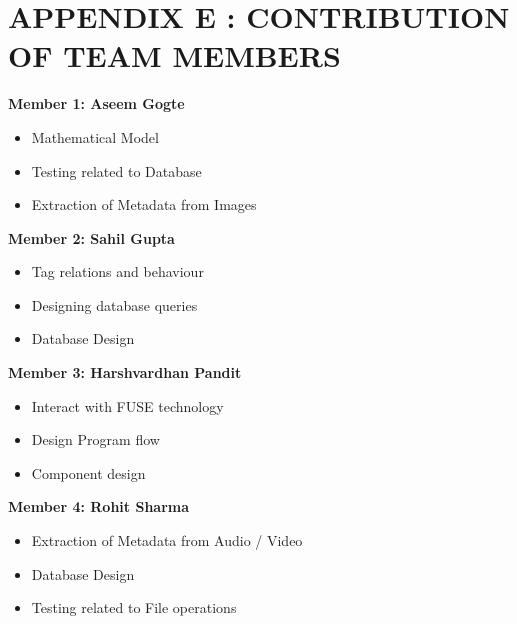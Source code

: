 \section{APPENDIX E : CONTRIBUTION OF TEAM MEMBERS} 
\noindent \textbf{Member 1: Aseem Gogte} 
\begin{itemize}
\item Mathematical Model
\item Testing related to Database 
\item Extraction of Metadata from Images \\
\end{itemize}

\noindent \textbf{Member 2: Sahil Gupta}
\begin{itemize}
\item Tag relations and behaviour
\item Designing database queries
\item Database Design \\
\end{itemize}

\noindent \textbf {Member 3: Harshvardhan Pandit} 
\begin{itemize}
\item Interact with FUSE technology
\item Design Program flow
\item Component design \\
\end{itemize}

\noindent \textbf {Member 4: Rohit Sharma} 
\begin{itemize}
\item Extraction of Metadata from Audio / Video 
\item Database Design
\item Testing related to File operations
\end{itemize}

